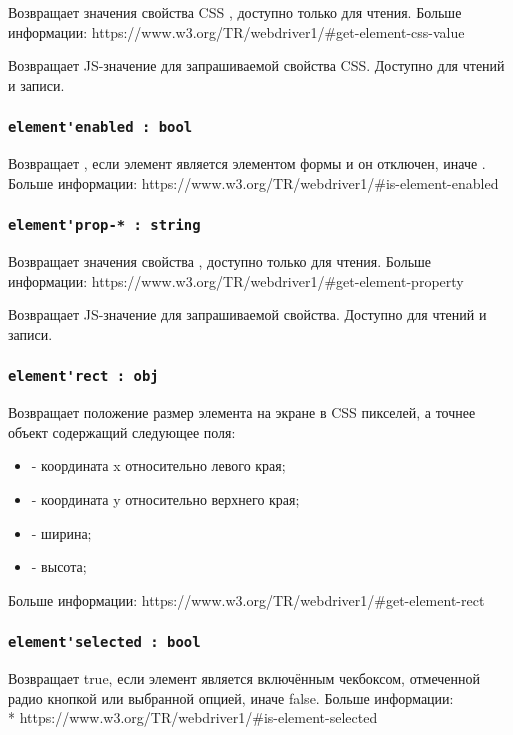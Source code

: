\documentclass[a4paper, 14pt]{extarticle}
\newenvironment{icItems}
	{ \begin{itemize} [noitemsep,nolistsep] }
	{ \end{itemize} }
\begin{document}
\code{[w3c]} Возвращает значения свойства CSS \code{*}, доступно только для чтения. Больше информации: https://www.w3.org/TR/webdriver1/\#get-element-css-value

\code{[icL]} Возвращает JS-значение для запрашиваемой свойства CSS. Доступно для чтений и записи.

\subsubsection{\lstinline|element'enabled : bool|}

Возвращает \false, если элемент является элементом формы и он отключен, иначе \true. Больше информации: https://www.w3.org/TR/webdriver1/\#is\--element\--enabled

\subsubsection{\lstinline|element'prop-* : string|}

\code{[w3c]} Возвращает значения свойства \code{*}, доступно только для чтения. Больше информации: https://www.w3.org/TR/webdriver1/\#get-element-property

\code{[icL]}  Возвращает JS-значение для запрашиваемой свойства. Доступно для чтений и записи.

\subsubsection{\lstinline|element'rect : obj|}

Возвращает положение размер элемента на экране в CSS пикселей, а точнее объект содержащий следующее поля:
\begin{icItems}
	\item {} - координата x относительно левого края;
	\item {} - координата y относительно верхнего края;
	\item {} - ширина;
	\item {} - высота;
\end{icItems}

Больше информации: https://www.w3.org/TR/webdriver1/\#get-element-rect

\subsubsection{\lstinline|element'selected : bool|}

Возвращает true, если элемент является включённым чекбоксом, отмеченной радио кнопкой или выбранной опцией, иначе false. Больше информации: \\* https://www.w3.org/TR/webdriver1/\#is-element-selected
\end{document}
